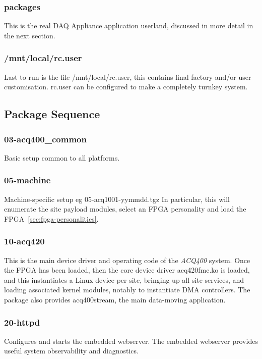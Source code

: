 \documentclass[]{article}
\newcommand{\glossy}[1]{{\color{blue}\itshape #1}}
\begin{document}
\subsubsection{packages}
This is the real DAQ Appliance application userland, discussed in more detail in the next section.

\subsubsection{/mnt/local/rc.user}
Last to run is the file /mnt/local/rc.user, this contains final factory and/or user customisation. rc.user can be configured to make a completely turnkey system.

\subsection{Package Sequence}


\subsubsection{03-acq400_common}
Basic setup common to all platforms.

\subsubsection{05-machine}
Machine-specific setup eg 05-acq1001-yymmdd.tgz
In particular, this will enumerate the site payload modules, select an FPGA personality and load the FPGA~\ref{sec:fpga-personalities}.

\subsubsection{10-acq420}
This is the main device driver and operating code of the \glossy{ACQ400} system.
Once the FPGA has been loaded, then the core device driver acq420fmc.ko is loaded, and this instantiates a Linux device per site, bringing up all site services, and loading associated kernel modules, notably to instantiate DMA controllers. The package also provides acq400stream, the main data-moving application.

\subsubsection{20-httpd}
Configures and starts the embedded webserver. The embedded webserver provides useful system observability and diagnostics.
\end{document}
